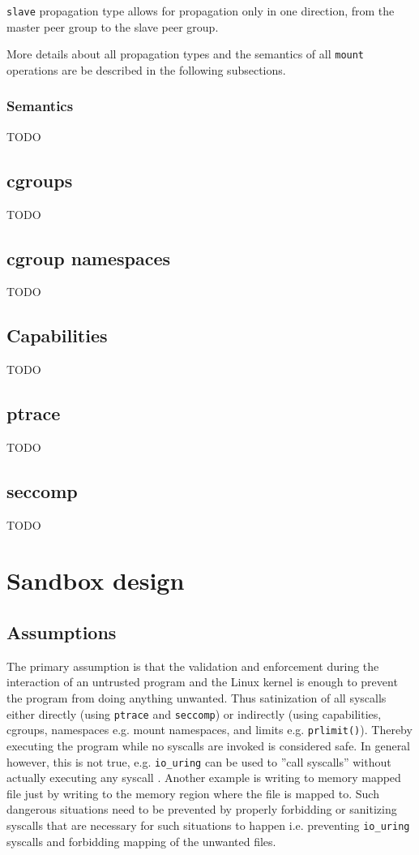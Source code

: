 \documentclass[licencjacka,en]{pracamgr}
\begin{document}
\texttt{slave} propagation type allows for propagation only in one direction, from the master peer group to the slave peer group.

More details about all propagation types and the semantics of all \texttt{mount} operations are be described in the following subsections.

\subsection{Semantics}
TODO

\section{cgroups}
TODO

\section{cgroup namespaces}
TODO

\section{Capabilities}
TODO

\section{ptrace}
TODO

\section{seccomp} \label{section:seccomp}
TODO

\chapter{Sandbox design} \label{chapter:design}

\section{Assumptions}

The primary assumption is that the validation and enforcement during the interaction of an untrusted program and the Linux kernel is enough to prevent the program from doing anything unwanted. Thus satinization of all syscalls either directly (using \texttt{ptrace} and \texttt{seccomp}) or indirectly (using capabilities, cgroups, namespaces e.g. mount namespaces, and limits e.g. \texttt{prlimit()}). Thereby executing the program while no syscalls are invoked is considered safe. In general however, this is not true, e.g. \texttt{io\_uring} can be used to ''call syscalls'' without actually executing any syscall \cite{lwn_io_uring}. Another example is writing to memory mapped file just by writing to the memory region where the file is mapped to. Such dangerous situations need to be prevented by properly forbidding or sanitizing syscalls that are necessary for such situations to happen i.e. preventing \texttt{io\_uring} syscalls and forbidding mapping of the unwanted files.
\end{document}
